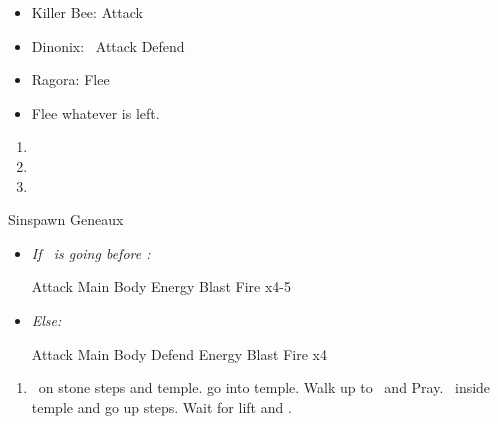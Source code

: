 \begin{encounters}
	\begin{itemize}
		\item Killer Bee: \wakkaf Attack
		\item Dinonix: \tidus\ Attack
		      \yunaf Defend
		\item Ragora: Flee
		\item Flee whatever is left.
	\end{itemize}
\end{encounters}
\begin{enumerate}[resume]
	\item \sd
	\item \formation{\tidus}{\yuna}{\wakka}
	\item \save
\end{enumerate}
\begin{battle}[3000]{Sinspawn Geneaux}
	\begin{itemize}
		\item \textit{If \tidus\ is going before \yuna:}
		      \begin{itemize}
			      \tidusf Attack Main Body
			      \summon{\valefor}
			      \valeforf Energy Blast \od
			      \valeforf Fire x4-5
		      \end{itemize}
		\item \textit{Else:}
		      \begin{itemize}
			      \switch{\yuna}{\kimahri}
			      \kimahrif Attack Main Body
			      \tidusf Defend
			      \switch{anyone}{\yuna}
			      \summon{\valefor}
			      \valeforf Energy Blast \od
			      \valeforf Fire x4
		      \end{itemize}
	\end{itemize}
\end{battle}
\begin{enumerate}[resume]
	\item \sd\ on stone steps and temple. go into temple. Walk up to \wakka\ and Pray. \sd\ inside temple and go up steps. Wait for lift and \sd.
\end{enumerate}
